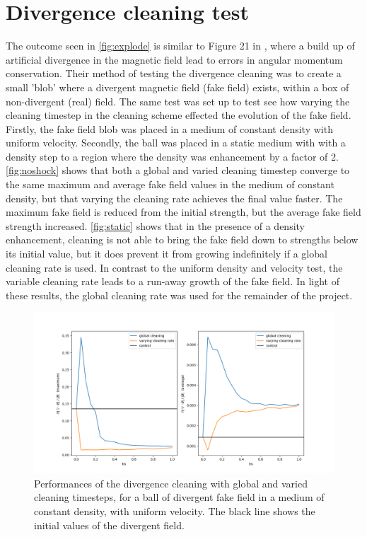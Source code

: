 \documentclass[11pt]{article}
\begin{document}
\section{Divergence cleaning test}
\label{sub:divclean}
The outcome seen in \autoref{fig:explode} is similar to Figure 21 in \cite{Tricco2012}, where a build up of artificial divergence in the magnetic field lead to errors in angular momentum conservation. Their method of testing the divergence cleaning was to create a small 'blob' where a divergent magnetic field (fake field) exists, within a box of non-divergent (real) field. The same test was set up to test see how varying the cleaning timestep in the \cite{Dedner2002} cleaning scheme effected the evolution of the fake field. Firstly, the fake field blob was placed in a medium of constant density with uniform velocity. Secondly, the ball was placed in a static medium with with a density step to a region where the density was enhancement by a factor of 2. \autoref{fig:noshock} shows that both a global and varied cleaning timestep converge to the same maximum and average fake field values in the medium of constant density, but that varying the cleaning rate achieves the final value faster. The maximum fake field is reduced from the initial strength, but the average fake field strength increased. \autoref{fig:static} shows that in the presence of a density enhancement, cleaning is not able to bring the fake field down to strengths below its initial value, but it does prevent it from growing indefinitely if a global cleaning rate is used. In contrast to the uniform density and velocity test, the variable cleaning rate leads to a run-away growth of the fake field. In light of these results, the global cleaning rate was used for the remainder of the project.

\begin{figure}[!htb]
         \centering
		\includegraphics[width=18cm]{noshock.png}
		\caption{Performances of the \cite{Dedner2002} divergence cleaning with global and varied cleaning timesteps, for a ball of divergent fake field in a medium of constant density, with uniform velocity. The black line shows the initial values of the divergent field.}
		\label{fig:noshock}
\end{figure}
\end{document}
